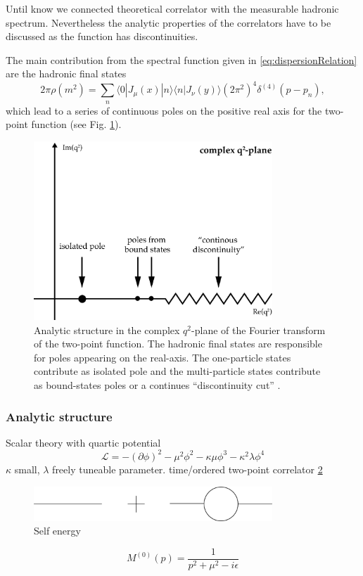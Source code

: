 \documentclass[../../index.tex]{subfiles}
\begin{document}
Until know we connected theoretical correlator with the measurable hadronic
spectrum. Nevertheless the analytic properties of the correlators have to be
discussed as the function has discontinuities.

The main contribution from the spectral function given in
\cref{eq:dispersionRelation} are the hadronic final states
\begin{equation}
  2 \pi \rho(m^2) = \sum_n \langle  0 | J_\mu(x) | n \rangle \langle n | J_\nu(y) \rangle (2 \pi^2)^4 \delta^{(4)}(p - p_n),
\end{equation}
which lead to a series of continuous poles on the positive real axis for the
two-point function (see Fig. \cref{fig:analyticStructureCorrelator}).
\begin{figure}
  \centering
  \includegraphics[width=0.8\textwidth]{./images/analyticStructureCorrelator.eps}
  \caption{Analytic structure in the complex $q^2$-plane of the Fourier
    transform of the two-point function. The hadronic final states are
    responsible for poles appearing on the real-axis. The one-particle states
    contribute as isolated pole and the multi-particle states contribute as
    bound-states poles or a continues ``discontinuity cut'' \cite{Peskin1995}.}
  \label{fig:analyticStructureCorrelator}
\end{figure}
\subsubsection{Analytic structure}
Scalar theory with quartic potential
\begin{equation}
  \mathcal{L} = - (\partial \phi)^2 - \mu^2 \phi^2 -\kappa \mu \phi^3 - \kappa^2\lambda \phi^4
\end{equation}
$\kappa$ small, $\lambda$ freely tuneable parameter.
time\-/ordered two-point correlator \cref{fig:twoPointFunctionSelfEnergy}
\begin{figure}
  \centering
  \includegraphics[width=0.8\textwidth]{./images/twoPointFunctionSelfEnergy}
  \caption{Self energy}
  \label{fig:twoPointFunctionSelfEnergy}
\end{figure}
\begin{equation}
  M^{(0)}(p) = \frac{1}{p^2+\mu^2-i\epsilon}
\end{equation}
\end{document}
